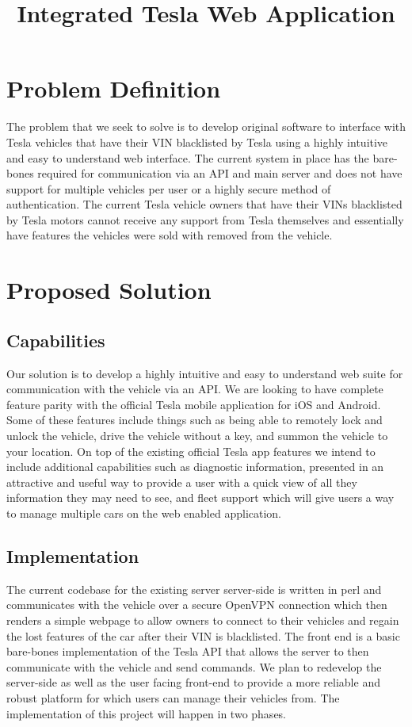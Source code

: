 \documentclass[10pt,letterpaper,draftclsnofoot,onecolumn]{IEEEtran}
\title{Integrated Tesla Web Application}
\author{
  \IEEEauthorblockN{Christopher Jansen}
  \IEEEauthorblockA{CS 461: Senior Capstone Fall 2018 \\ Oregon State University \\ Group 22}
}
\date{}
\begin{document}
\maketitle
\IEEEdisplaynontitleabstractindextext
\newpage
\tableofcontents
\newpage
\begin{singlespace}



\section{Problem Definition}
The problem that we seek to solve is to develop original software to interface with Tesla vehicles that have their VIN blacklisted by Tesla using a highly intuitive and easy to understand web interface. The current system in place has the bare-bones required for communication via an API and main server and does not have support for multiple vehicles per user or a highly secure method of authentication. The current Tesla vehicle owners that have their VINs blacklisted by Tesla motors cannot receive any support from Tesla themselves and essentially have features the vehicles were sold with removed from the vehicle. 
\section{Proposed Solution}

\subsection{Capabilities}
Our solution is to develop a highly intuitive and easy to understand web suite for communication with the vehicle via an API. We are looking to have complete feature parity with the official Tesla mobile application for iOS and Android. Some of these features include things such as being able to remotely lock and unlock the vehicle, drive the vehicle without a key, and summon the vehicle to your location. On top of the existing official Tesla app features we intend to include additional capabilities such as diagnostic information, presented in an attractive and useful way to provide a user with a quick view of all they information they may need to see, and fleet support which will give users a way to manage multiple cars on the web enabled application.

\subsection{Implementation}
The current codebase for the existing server server-side is written in perl and communicates with the vehicle over a secure OpenVPN connection which then renders a simple webpage to allow owners to connect to their vehicles and regain the lost features of the car after their VIN is blacklisted. The front end is a basic bare-bones implementation of the Tesla API that allows the server to then communicate with the vehicle and send commands. We plan to redevelop the server-side as well as the user facing front-end to provide a more reliable and robust platform for which users can manage their vehicles from. The implementation of this project will happen in two phases.


\end{singlespace}
\end{document}
